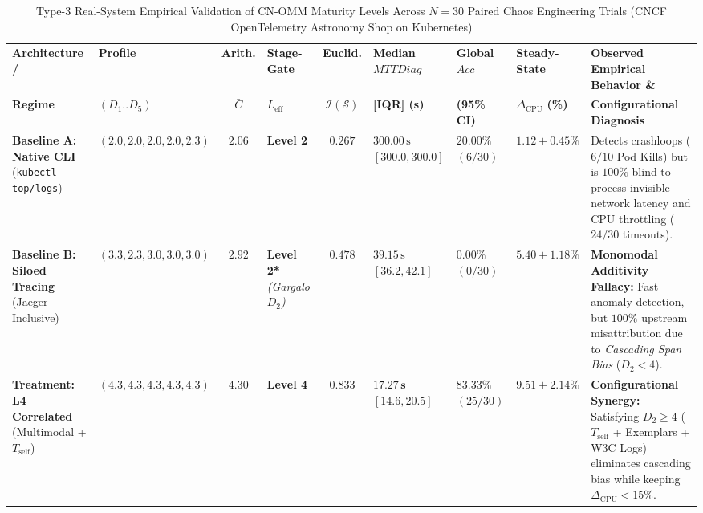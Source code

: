 \begin{table}[!t]
\centering
\caption{Type-3 Real-System Empirical Validation of CN-OMM Maturity Levels Across $N=30$ Paired Chaos Engineering Trials (CNCF OpenTelemetry Astronomy Shop on Kubernetes)}
\label{tab:empirical_validation}
\footnotesize
\setlength{\tabcolsep}{2.5pt}
\renewcommand{\arraystretch}{1.20}
\begin{tabularx}{\textwidth}{>{\raggedright\arraybackslash}p{2.2cm} >{\centering\arraybackslash}p{1.9cm} c >{\centering\arraybackslash}p{1.1cm} c >{\centering\arraybackslash}p{1.5cm} >{\centering\arraybackslash}p{1.4cm} >{\centering\arraybackslash}p{1.4cm} >{\raggedright\arraybackslash}X}
\toprule
\textbf{Architecture /} & \textbf{Profile} & \textbf{Arith.} & \textbf{Stage-Gate} & \textbf{Euclid.} & \textbf{Median $MTTDiag$} & \textbf{Global $Acc$} & \textbf{Steady-State} & \textbf{Observed Empirical Behavior \&} \\
\textbf{Regime} & $(D_1..D_5)$ & $\bar{C}$ & $L_{\text{eff}}$ & $\mathcal{I}(\mathcal{S})$ & \textbf{[IQR] (s)} & \textbf{(95\% CI)} & $\Delta_{\text{CPU}}$ \textbf{(\%)} & \textbf{Configurational Diagnosis} \\
\midrule
\textbf{Baseline A: Native CLI} \newline (\texttt{kubectl top/logs}) & $(2.0, 2.0, 2.0, 2.0, 2.3)$ & $2.06$ & \textbf{Level 2} & $0.267$ & $300.00\,\text{s}$ \newline $[300.0, 300.0]$ & $20.00\%$ \newline $(6/30)$ & $1.12 \pm 0.45\%$ & Detects crashloops ($6/10$ Pod Kills) but is $100\%$ blind to process-invisible network latency and CPU throttling ($24/30$ timeouts). \\
\midrule
\textbf{Baseline B: Siloed Tracing} \newline (Jaeger Inclusive) & $(3.3, \mathbf{2.3}, 3.0, 3.0, 3.0)$ & $2.92$ & \textbf{Level 2*} \newline \textit{(Gargalo $D_2$)} & $0.478$ & $39.15\,\text{s}$ \newline $[36.2, 42.1]$ & $0.00\%$ \newline $(0/30)$ & $5.40 \pm 1.18\%$ & \textbf{Monomodal Additivity Fallacy:} Fast anomaly detection, but $100\%$ upstream misattribution due to \textit{Cascading Span Bias} ($D_2 < 4$). \\
\midrule
\textbf{Treatment: L4 Correlated} \newline (Multimodal + $T_{\text{self}}$) & $(4.3, 4.3, 4.3, 4.3, 4.3)$ & $4.30$ & \textbf{Level 4} & $0.833$ & $\mathbf{17.27\,\text{s}}$ \newline $[14.6, 20.5]$ & $\mathbf{83.33\%}$ \newline $(25/30)$ & $\mathbf{9.51 \pm 2.14\%}$ & \textbf{Configurational Synergy:} Satisfying $D_2 \ge 4$ ($T_{\text{self}}$ + Exemplars + W3C Logs) eliminates cascading bias while keeping $\Delta_{\text{CPU}} < 15\%$. \\

\end{tabularx}
\end{table}
